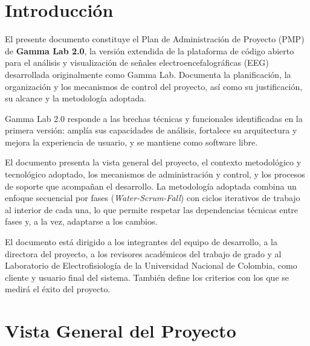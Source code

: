 \documentclass{article}
\begin{document}
\newpage


\tableofcontents


\newpage


\maketitle

\section{Introducción}

El presente documento constituye el Plan de Administración de Proyecto (PMP) de \textbf{Gamma Lab 2.0}, la versión extendida de la plataforma de código abierto para el análisis y visualización de señales electroencefalográficas (EEG) desarrollada originalmente como Gamma Lab. Documenta la planificación, la organización y los mecanismos de control del proyecto, así como su justificación, su alcance y la metodología adoptada.

Gamma Lab 2.0 responde a las brechas técnicas y funcionales identificadas en la primera versión: amplía sus capacidades de análisis, fortalece su arquitectura y mejora la experiencia de usuario, y se mantiene como software libre.

El documento presenta la vista general del proyecto, el contexto metodológico y tecnológico adoptado, los mecanismos de administración y control, y los procesos de soporte que acompañan el desarrollo. La metodología adoptada combina un enfoque secuencial por fases (\textit{Water-Scrum-Fall}) con ciclos iterativos de trabajo al interior de cada una, lo que permite respetar las dependencias técnicas entre fases y, a la vez, adaptarse a los cambios.

El documento está dirigido a los integrantes del equipo de desarrollo, a la directora del proyecto, a los revisores académicos del trabajo de grado y al Laboratorio de Electrofisiología de la Universidad Nacional de Colombia, como cliente y usuario final del sistema. También define los criterios con los que se medirá el éxito del proyecto.

\section{Vista General del Proyecto}
 
\end{document}
